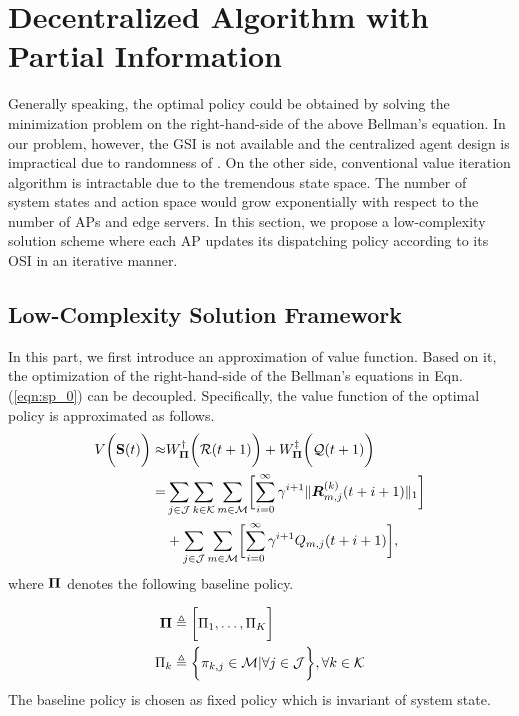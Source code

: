 \section{Decentralized Algorithm with Partial Information}
Generally speaking, the optimal policy could be obtained by solving the minimization problem on the right-hand-side of the above Bellman's equation. %
In our problem, however, the GSI is not available and the centralized agent design is impractical due to randomness of \brlatency.
On the other side, conventional value iteration algorithm is intractable due to the tremendous state space.
The number of system states and action space would grow exponentially with respect to the number of APs and edge servers.
In this section, we propose a low-complexity solution scheme where each AP updates its dispatching policy according to its OSI in an iterative manner.

\subsection{Low-Complexity Solution Framework}
In this part, we first introduce an approximation of value function.
Based on it, the optimization of the right-hand-side of the Bellman's equations in Eqn.(\ref{eqn:sp_0}) can be decoupled.
Specifically, the value function of the optimal policy is approximated as follows.
\begin{align}
    V\Paren{\Stat(t)} \approx&
        W^{\AP}_{\Baseline}\Paren{\mathcal{R}(t+1)} + W^{\ES}_{\Baseline}\Paren{\mathcal{Q}(t+1)}
    \nonumber\\
    =& \sum_{j\in\jSpace}\sum_{k\in\apSet}\sum_{m\in\esSet} \Bracket{
        \sum_{i=0}^{\infty} \gamma^{i+1} \Inorm{ \vecG{R}^{(k)}_{m,j}(t+i+1) }
    }
    \nonumber\\
    & + \sum_{j\in\jSpace}\sum_{m\in\esSet} \Bracket{
        \sum_{i=0}^{\infty} \gamma^{i+1} Q_{m,j}(t+i+1)
    },
    \label{eqn:approx}
\end{align}
where $\boldsymbol{\Pi}$ denotes the following baseline policy.
\begin{definition}
    \begin{align}
        \boldsymbol{\Pi} &\triangleq \bigg[ \Pi_{1}, \dots, \Pi_{K} \bigg]
        \\
        \Pi_{k} &\triangleq \bigg\{\pi_{k,j}\in\mathcal{M}|\forall j\in\mathcal{J}\bigg\}, \forall k\in\mathcal{K}
    \end{align}
    The baseline policy is chosen as fixed policy which is invariant of system state.
\end{definition}

